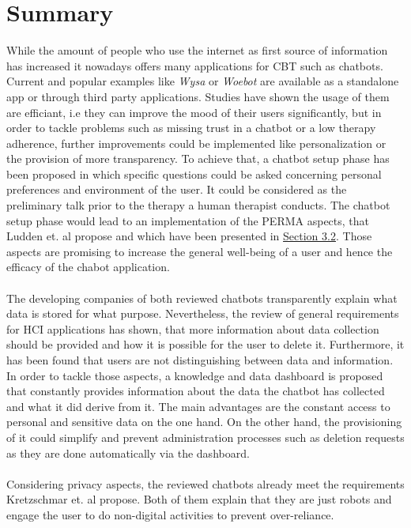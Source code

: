\documentclass[sigconf, nonacm]{acmart}
\begin{document}
\section{Summary}
\label{sec:five}
While the amount of people who use the internet as first source of information has increased\cite{Wyatt2015} it nowadays offers many applications for CBT such as chatbots. 
\\
Current and popular examples like \emph{Wysa} or \emph{Woebot} are available as a standalone app or through third party applications. Studies have shown the usage of them are efficiant, i.e they can improve the mood of their users significantly\cite{Fitzpatrick2017,Inkster}, but in order to tackle problems such as missing trust in a chatbot or a low therapy adherence, further improvements could be implemented like personalization 
or the provision of more transparency. To achieve that, a chatbot setup phase has been proposed in which specific questions could be asked concerning personal preferences and environment of the user. It could be considered as the preliminary talk prior to the therapy a human therapist conducts.
The chatbot setup phase would lead to an implementation of the PERMA aspects, that Ludden et. al \cite{Ludden2015} propose and which have been presented in \hyperref[sec:three_two]{Section 3.2}. Those aspects are promising to increase the general well-being of a user and hence the efficacy of the chabot application.
\\\\
The developing companies of both reviewed chatbots transparently explain what data is stored for what purpose.
Nevertheless, the review of general requirements for HCI applications has shown, that more information about data collection should be provided and how it is possible for the user to delete it\cite{Saglam2021}.
Furthermore, it has been found that users are not distinguishing between data and information\cite{Lee2011}.
In order to tackle those aspects, a knowledge and data dashboard is proposed that constantly provides information about the data the chatbot has collected and what it did derive from it.
The main advantages are the constant access to personal and sensitive data on the one hand. On the other hand, the provisioning of it could simplify and prevent administration processes such as deletion requests as they are done automatically via the dashboard.
\\\\
Considering privacy aspects, the reviewed chatbots already meet the requirements Kretzschmar et. al \cite{Kretzschmar2019} propose. Both of them explain that they are just robots and engage the user to do non-digital activities to prevent over-reliance.
\end{document}

